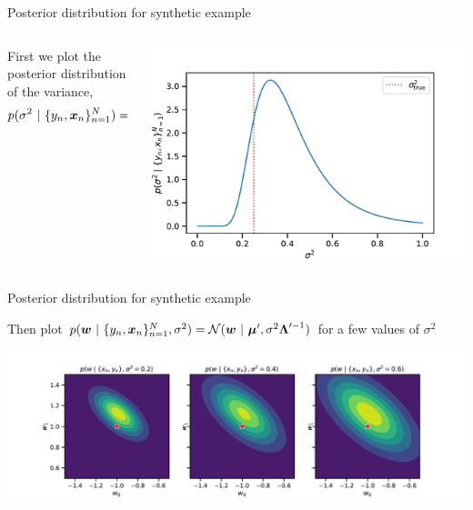 \documentclass[aspectratio=169]{beamer}
\begin{document}
\begin{frame}{Posterior distribution for synthetic example}

\begin{columns}
\begin{column}{.5\textwidth}
First we plot the posterior distribution of the variance, 
\begin{align}
    p(\sigma^2 ~\vert~ \{y_n, \boldsymbol{x}_n\}_{n=1}^N)
    &= \mathrm{IGa}(\nu', \tau'^2) 
\end{align}
\end{column}

\begin{column}{.5\textwidth}
\includegraphics[width=\linewidth]{figures/lap1/sigmasq_post.pdf}
\end{column}
\end{columns}
    
\end{frame}

\begin{frame}{Posterior distribution for synthetic example}

Then plot $p(\boldsymbol{w} ~\vert~ \{y_n, \boldsymbol{x}_n\}_{n=1}^N, \sigma^2 )= \mathcal{N}(\boldsymbol{w} ~\vert~ \boldsymbol{\mu}', \sigma^2 \boldsymbol{\Lambda}'^{-1})$ for a few values of $\sigma^2$

\begin{center}
\includegraphics[width=.95\linewidth]{figures/lap1/w_post.pdf}
\end{center}

\end{frame}
\end{document}
